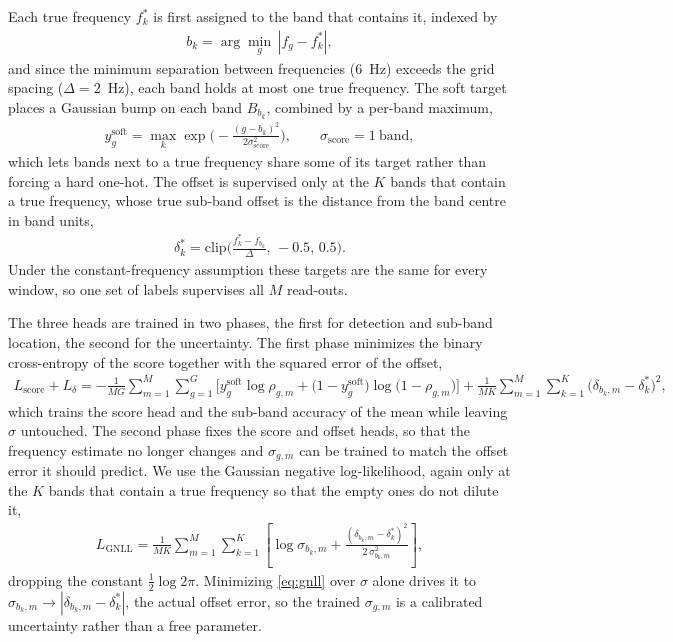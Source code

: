 \documentclass[journal,onecolumn]{IEEEtran}
\begin{document}
Each true frequency $f_k^\ast$ is first assigned to the band that contains it, indexed by
\begin{eqnarray}
\label{eq:anchor}
b_k=\arg\min_g\,|f_g-f_k^\ast|,
\end{eqnarray}
and since the minimum separation between frequencies ($6$~Hz) exceeds the grid spacing ($\Delta=2$~Hz), each band holds at most one true frequency. The soft target places a Gaussian bump on each band $B_{b_k}$, combined by a per-band maximum,
\begin{eqnarray}
\label{eq:softlabel}
y^{\mathrm{soft}}_g=\max_{k}\exp\!\Big(-\frac{(g-b_k)^2}{2\sigma_{\mathrm{score}}^2}\Big),
\qquad \sigma_{\mathrm{score}}=1\ \text{band},
\end{eqnarray}
which lets bands next to a true frequency share some of its target rather than forcing a hard one-hot. The offset is supervised only at the $K$ bands that contain a true frequency, whose true sub-band offset is the distance from the band centre in band units,
\begin{eqnarray}
\label{eq:deltatrue}
\delta^\ast_k=\mathrm{clip}\!\Big(\frac{f_k^\ast-f_{b_k}}{\Delta},\,-0.5,\,0.5\Big).
\end{eqnarray}
Under the constant-frequency assumption these targets are the same for every window, so one set of labels supervises all $M$ read-outs.

The three heads are trained in two phases, the first for detection and sub-band location, the second for the uncertainty. The first phase minimizes the binary cross-entropy of the score together with the squared error of the offset,
\begin{eqnarray}
\label{eq:lscore}
L_{\mathrm{score}}+L_\delta=
-\frac{1}{MG}\sum_{m=1}^{M}\sum_{g=1}^{G}\Big[y^{\mathrm{soft}}_g\log\rho_{g,m}
+\big(1-y^{\mathrm{soft}}_g\big)\log\big(1-\rho_{g,m}\big)\Big]
+\frac{1}{MK}\sum_{m=1}^{M}\sum_{k=1}^{K}\big(\delta_{b_k,m}-\delta^\ast_k\big)^2,
\end{eqnarray}
which trains the score head and the sub-band accuracy of the mean while leaving $\sigma$ untouched. The second phase fixes the score and offset heads, so that the frequency estimate no longer changes and $\sigma_{g,m}$ can be trained to match the offset error it should predict. We use the Gaussian negative log-likelihood, again only at the $K$ bands that contain a true frequency so that the empty ones do not dilute it,
\begin{eqnarray}
\label{eq:gnll}
L_{\mathrm{GNLL}}=\frac{1}{MK}\sum_{m=1}^{M}\sum_{k=1}^{K}\left[\log\sigma_{b_k,m}+\frac{(\delta_{b_k,m}-\delta^\ast_k)^2}{2\,\sigma_{b_k,m}^2}\right],
\end{eqnarray}
dropping the constant $\tfrac12\log 2\pi$. Minimizing \eqref{eq:gnll} over $\sigma$ alone drives it to $\sigma_{b_k,m}\!\to\!|\delta_{b_k,m}-\delta^\ast_k|$, the actual offset error, so the trained $\sigma_{g,m}$ is a calibrated uncertainty rather than a free parameter.
\end{document}

